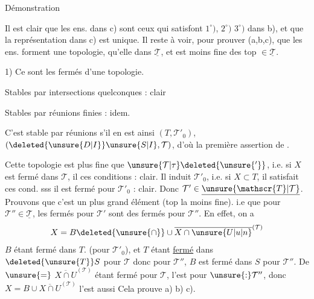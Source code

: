 Démonstration

  Il est clair que les ens.  dans c) sont ceux qui satisfont $1^\circ)$, $2^\circ)$ $3^\circ)$ dans b), et que la représentation dans c) est unique. Il reste à voir, pour prouver (a,b,c), que les ens. forment une topologie,  qu'elle   dans $\underline{\mathcal{T}}$, et est moins fine des top $\in\underline{\mathcal{T}}$.

1) Ce sont les fermés d'une topologie.

Stables par intersections quelconques : clair

Stables par réunions finies : idem.

C'est \unsure{$=$} stable par réunions  s'il en est ainsi  $(T,\mathcal{T}'_0)$, $(\deleted{\unsure{D|I}}\unsure{S|I},\mathcal{T})$, d'où la première assertion de .

Cette topologie est plus fine que $\unsure{\mathcal{T}|\tau}\deleted{\unsure{'}}$, i.e. si $X$ est fermé dans $\mathcal{T}$, il  ces conditions : clair. Il induit $\mathcal{T}'_0$, i.e. si $X\subset T$, il satisfait ces cond. sss il est fermé pour $\mathcal{T}'_0$ : clair. Donc $\mathcal{T}'\in\underline{\unsure{\mathscr{T}|\mathcal{T}}}$. Prouvons que c'est un plus grand élément (top la moins fine). i.e que pour  $\mathcal{T}''\in\underline{\mathcal{T}}$, les fermés pour $\mathcal{T}'$ sont des fermés pour $\mathcal{T}''$. En effet, on a
\[
X=B\deleted{\unsure{\cap}}\cup\overline{X\cap\unsure{U|u|n}}^{(\mathcal{T})}
\]
$B$ étant fermé dans $T$. (pour $\mathcal{T}'_0$), et $T$ étant \uline{fermé} dans $\deleted{\unsure{T}}S$ pour $\mathcal{T}$ donc  pour $\mathcal{T}''$, $B$ est fermé dans $S$ pour $\mathcal{T}''$.
De $\unsure{=}$ $\overline{X\cap U}^{(\mathcal{T})}$ étant fermé pour $\mathcal{T}$, l'est pour $\unsure{:}\mathcal{T}''$, donc $X=B\cup\overline{X\cap U}^{(\mathcal{T})}$ l'est aussi Cela prouve a) b) c).

